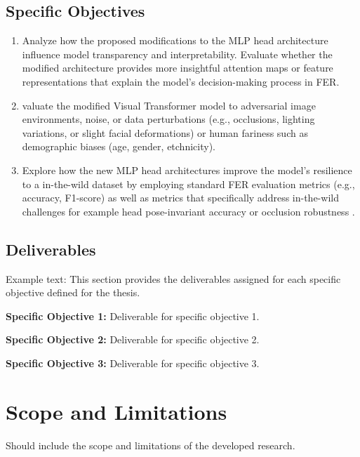 \subsection{Specific Objectives}
\label{section:specific-objectives}

\begin{enumerate}
	\item Analyze how the proposed modifications to the MLP head architecture influence model transparency and interpretability. Evaluate whether the modified architecture provides more insightful attention maps or feature representations that explain the model’s decision-making process in FER. 
	
\item valuate the modified Visual Transformer model to adversarial image environments, noise, or data perturbations (e.g., occlusions, lighting variations, or slight facial deformations) or human fariness such as demographic biases (age, gender, etchnicity). 
	
\item Explore how the new MLP head architectures improve the model’s resilience to a in-the-wild dataset by employing standard FER evaluation metrics (e.g., accuracy, F1-score) as well as metrics that specifically address in-the-wild challenges for example head pose-invariant accuracy or occlusion robustness .
	
\end{enumerate}

\subsection{Deliverables}
Example text:
This section provides the deliverables assigned for each specific objective defined for the thesis.

\textbf{Specific Objective 1:}
Deliverable for specific objective 1. 

\textbf{Specific Objective 2:}
Deliverable for specific objective 2.

\textbf{Specific Objective 3:}
Deliverable for specific objective 3.

\section{Scope and Limitations}

Should include the scope and limitations of the developed research.

